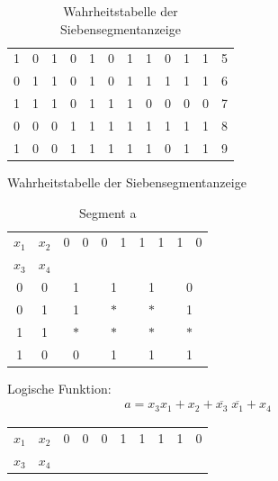 \documentclass[numbers=noenddot,12pt,a4paper]{scrartcl}
\begin{document}
\begin{figure}[H]
\begin{minipage}[htbp]{0.68\textwidth}
\begin{table}[H]
\begin{tabular}{cccc||ccccccc||c}
1 & 0 & 1 & 0 & 1 & 0 & 1 & 1 & 0 & 1 & 1 & 5 \\
0 & 1 & 1 & 0 & 1 & 0 & 1 & 1 & 1 & 1 & 1 & 6 \\
1 & 1 & 1 & 0 & 1 & 1 & 1 & 0 & 0 & 0 & 0 & 7 \\
0 & 0 & 0 & 1 & 1 & 1 & 1 & 1 & 1 & 1 & 1 & 8 \\
1 & 0 & 0 & 1 & 1 & 1 & 1 & 1 & 0 & 1 & 1 & 9 \\
\end{tabular}
\caption{Wahrheitstabelle der Siebensegmentanzeige} \label{tab:wahr}
\end{table}
\end{minipage}
\end{figure}

\begin{figure}[H]
\begin{minipage}[htbp]{0.49\textwidth}
\begin{table}[H]
\centering
\begin{tabular}{cc||cc|cc|cc|cc}
$x_1$ & $x_2$ & 0 & 0 & 0 & 1 & 1 & 1 & 1 & 0 \\ \cline{0-1} 
$x_3$ & $x_4$ & & & & & & & & \\ \cline{1-10}
0 & 0 & \multicolumn{2}{|c|}{1} & \multicolumn{2}{|c|}{1} & \multicolumn{2}{|c|}{1} & \multicolumn{2}{|c}{0} \\
0 & 1 & \multicolumn{2}{|c|}{1} & \multicolumn{2}{|c|}{$\ast$} & \multicolumn{2}{|c|}{$\ast$} & \multicolumn{2}{|c}{1} \\ 
1 & 1 & \multicolumn{2}{|c|}{$\ast$} & \multicolumn{2}{|c|}{$\ast$} & \multicolumn{2}{|c|}{$\ast$} & \multicolumn{2}{|c}{$\ast$} \\ 
1 & 0 & \multicolumn{2}{|c|}{0} & \multicolumn{2}{|c|}{1} & \multicolumn{2}{|c|}{1} & \multicolumn{2}{|c}{1} \\ 
\end{tabular}
\caption{Segment a}
\end{table}
Logische Funktion:
\begin{align}
a= x_3 x_1  + x_2 + \overline{x_3} \; \overline{x_1}  + x_4
\end{align}
\end{minipage}
\hfill
\begin{minipage}[htbp]{0.49\textwidth}
\begin{table}[H]
\centering
\begin{tabular}{cc||cc|cc|cc|cc}
$x_1$ & $x_2$ & 0 & 0 & 0 & 1 & 1 & 1 & 1 & 0 \\ \cline{0-1} 
$x_3$ & $x_4$ & & & & & & & & \\ \cline{1-10}

\end{tabular}
\end{table}
\end{minipage}
\end{figure}
\end{document}
